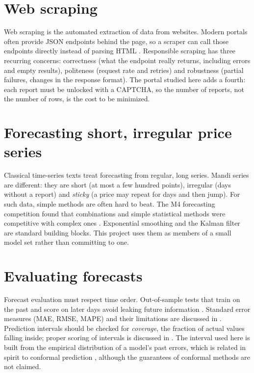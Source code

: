 \documentclass[12pt,a4paper,oneside]{report}
\numberwithin{equation}{chapter}
\numberwithin{figure}{chapter}
\numberwithin{table}{chapter}
\theoremstyle{definition}
\begin{document}
\section{Web scraping}
Web scraping is the automated extraction of data from websites. Modern portals often provide JSON endpoints behind the page, so a scraper can call those endpoints directly instead of parsing HTML \cite{glez2014}. Responsible scraping has three recurring concerns: correctness (what the endpoint really returns, including errors and empty results), politeness (request rate and retries) and robustness (partial failures, changes in the response format). The portal studied here adds a fourth: each report must be unlocked with a CAPTCHA, so the number of reports, not the number of rows, is the cost to be minimized.

\section{Forecasting short, irregular price series}
Classical time-series texts \cite{hamilton1994,hyndman2021} treat forecasting from regular, long series. Mandi series are different: they are short (at most a few hundred points), irregular (days without a report) and \emph{sticky} (a price may repeat for days and then jump). For such data, simple methods are often hard to beat. The M4 forecasting competition found that combinations and simple statistical methods were competitive with complex ones \cite{makridakis2020}. Exponential smoothing \cite{gardner1985} and the Kalman filter \cite{kalman1960,welch2006,durbin2012} are standard building blocks. This project uses them as members of a small model set rather than committing to one.

\section{Evaluating forecasts}
Forecast evaluation must respect time order. Out-of-sample tests that train on the past and score on later days avoid leaking future information \cite{tashman2000}. Standard error measures (MAE, RMSE, MAPE) and their limitations are discussed in \cite{hyndman2006}. Prediction intervals should be checked for \emph{coverage}, the fraction of actual values falling inside; proper scoring of intervals is discussed in \cite{gneiting2007}. The interval used here is built from the empirical distribution of a model's past errors, which is related in spirit to conformal prediction \cite{shafer2008}, although the guarantees of conformal methods are not claimed.
\end{document}
